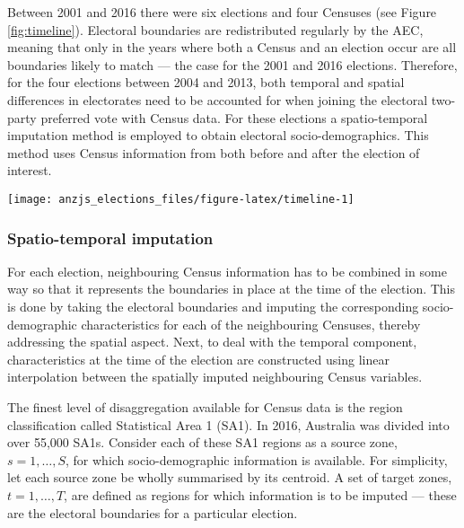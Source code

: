 \documentclass[times, doublespace]{anzsauth}
\let\origfigure\figure
\let\endorigfigure\endfigure
\renewenvironment{figure}[1][2] {
    \expandafter\origfigure\expandafter[htbp]
} {
    \endorigfigure
}
\begin{document}
Between 2001 and 2016 there were six elections and four Censuses (see Figure \ref{fig:timeline}). Electoral boundaries are redistributed regularly by the AEC, meaning that only in the years where both a Census and an election occur are all boundaries likely to match --- the case for the 2001 and 2016 elections. Therefore, for the four elections between 2004 and 2013, both temporal and spatial differences in electorates need to be accounted for when joining the electoral two-party preferred vote with Census data. For these elections a spatio-temporal imputation method is employed to obtain electoral socio-demographics. This method uses Census information from both before and after the election of interest.

\begin{figure}[h]

{\centering \texttt{[image: anzjs\_elections\_files/figure-latex/timeline-1]} 

}

\caption{Timeline of Australian elections and Censuses. They do not always occur in the same year.}\label{fig:timeline}
\end{figure}

\hypertarget{spatio-temporal-imputation}{%
\subsubsection*{Spatio-temporal imputation}\label{spatio-temporal-imputation}}

For each election, neighbouring Census information has to be combined in some way so that it represents the boundaries in place at the time of the election. This is done by taking the electoral boundaries and imputing the corresponding socio-demographic characteristics for each of the neighbouring Censuses, thereby addressing the spatial aspect. Next, to deal with the temporal component, characteristics at the time of the election are constructed using linear interpolation between the spatially imputed neighbouring Census variables.

The finest level of disaggregation available for Census data is the region classification called Statistical Area 1 (SA1). In 2016, Australia was divided into over 55,000 SA1s. Consider each of these SA1 regions as a source zone, \(s = 1,\dots,S\), for which socio-demographic information is available. For simplicity, let each source zone be wholly summarised by its centroid. A set of target zones, \(t = 1,\dots,T\), are defined as regions for which information is to be imputed --- these are the electoral boundaries for a particular election.
\end{document}
